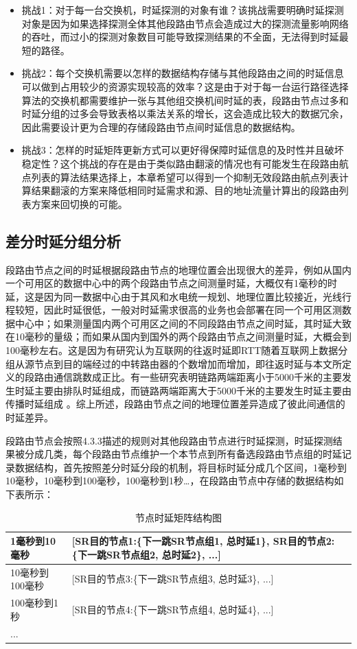 \begin{itemize}
\item 挑战1：对于每一台交换机，时延探测的对象有谁？该挑战需要明确时延探测对象是因为如果选择探测全体其他段路由节点会造成过大的探测流量影响网络的吞吐，而过小的探测对象数目可能导致探测结果的不全面，无法得到时延最短的路径。
\item 挑战2：每个交换机需要以怎样的数据结构存储与其他段路由之间的时延信息可以做到占用较少的资源实现较高的效率？这是由于对于每一台运行路径选择算法的交换机都需要维护一张与其他组交换机间时延的表，段路由节点过多和时延分组的过多会导致表格以乘法关系的增长，这会造成比较大的数据冗余，因此需要设计更为合理的存储段路由节点间时延信息的数据结构。
\item 挑战3：怎样的时延矩阵更新方式可以更好得保障时延信息的及时性并且破坏稳定性？这个挑战的存在是由于类似路由翻滚的情况也有可能发生在段路由航点列表的算法结果选择上，本章希望可以得到一个抑制无效段路由航点列表计算结果翻滚的方案来降低相同时延需求和源、目的地址流量计算出的段路由列表方案来回切换的可能。
\end{itemize}

\subsection{差分时延分组分析}

段路由节点之间的时延根据段路由节点的地理位置会出现很大的差异，例如从国内一个可用区的数据中心中的两个段路由节点之间测量时延，大概仅有1毫秒的时延，这是因为同一数据中心由于其风和水电统一规划、地理位置比较接近，光线行程较短，因此时延很低，一般对时延需求很高的业务也会部署在同一个可用区测数据中心中；如果测量国内两个可用区之间的不同段路由节点之间时延，其时延大致在10毫秒的量级；而如果从国内到国外的两个段路由节点之间测量时延，大概会到100毫秒左右。这是因为有研究认为互联网的往返时延即RTT随着互联网上数据分组从源节点到目的端经过的中转路由器的个数增加而增加，即往返时延与本文所定义的段路由通信跳数成正比。有一些研究表明链路两端距离小于5000千米的主要发生时延主要由排队时延组成，而链路两端距离大于5000千米的主要发生时延主要由传播时延组成 \cite{DELAY} 。综上所述，段路由节点之间的地理位置差异造成了彼此间通信的时延差异。

段路由节点会按照4.3.3描述的规则对其他段路由节点进行时延探测，时延探测结果被分成几类，每个段路由节点维护一个本节点到所有备选段路由节点组的时延记录数据结构，首先按照差分时延分段的机制，将目标时延分成几个区间，1毫秒到10毫秒，10毫秒到100毫秒，100毫秒到1秒…，在段路由节点中存储的数据结构如下表所示：

\begin{table}[]
\begin{tabular}{|p{}|p{}|}
\hline
1毫秒到10毫秒 & {[}SR目的节点1:\{下一跳SR节点组1, 总时延1\}, SR目的节点2:\{下一跳SR节点组2, 总时延2\}, ...{]} \\ \hline
10毫秒到100毫秒 & {[}SR目的节点3:\{下一跳SR节点组3, 总时延3\}, ...{]} \\ \hline
100毫秒到1秒 & {[}SR目的节点4:\{下一跳SR节点组4, 总时延4\}, ...{]} \\ \hline
... &  \\ \hline
\end{tabular}
\caption{节点时延矩阵结构图}
\label{table-delay-metric}
\end{table}

